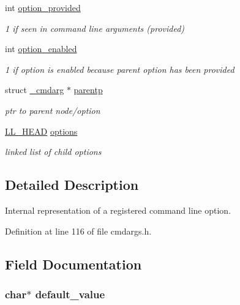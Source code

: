 \begin{DoxyCompactItemize}
int \hyperlink{struct__cmdarg_aaf09a033a5ef37d5ce2e929df503ead3}{option\-\_\-provided}
\begin{DoxyCompactList}\small\item\em 1 if seen in command line arguments (provided) \end{DoxyCompactList}\item 
int \hyperlink{struct__cmdarg_a27ed6f1811d3a359323c9fa92a46c351}{option\-\_\-enabled}
\begin{DoxyCompactList}\small\item\em 1 if option is enabled because parent option has been provided \end{DoxyCompactList}\item 
struct \hyperlink{struct__cmdarg}{\-\_\-cmdarg} $\ast$ \hyperlink{struct__cmdarg_aa8f98b01d07f3ae3514ed71bc0964e58}{parentp}
\begin{DoxyCompactList}\small\item\em ptr to parent node/option \end{DoxyCompactList}\item 
\hyperlink{struct_l_l___h_e_a_d}{L\-L\-\_\-\-H\-E\-A\-D} \hyperlink{struct__cmdarg_a73886e6f7ae7309944d9ee82137fbc63}{options}
\begin{DoxyCompactList}\small\item\em linked list of child options \end{DoxyCompactList}\end{DoxyCompactItemize}


\subsection{Detailed Description}
Internal representation of a registered command line option. 

Definition at line 116 of file cmdargs.\-h.



\subsection{Field Documentation}
\hypertarget{struct__cmdarg_a63daa7373909719597b83a97f0a9d2a9}{
\subsubsection[{default\-\_\-value}]{\setlength{\rightskip}{0pt plus 5cm}char$\ast$ default\-\_\-value}}\label{struct__cmdarg_a63daa7373909719597b83a97f0a9d2a9}


